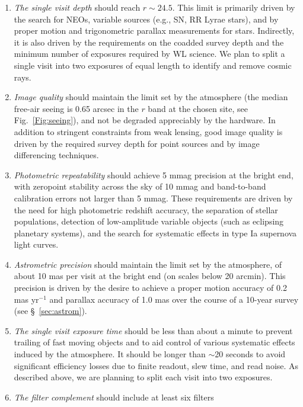 \begin{enumerate}
\item  \textit{The single visit depth} should reach $r\sim24.5$. This limit is
   primarily driven by the search for NEOs, variable sources (e.g., SN,
   RR Lyrae stars), and by proper motion and trigonometric parallax
   measurements for stars. Indirectly, it is also driven by the
   requirements on the coadded survey depth and the minimum number of
   exposures required by WL science.  We plan to split a single visit
   into two exposures of equal length to identify and remove cosmic
   rays.
\item  \textit{Image quality} should maintain the limit set by the
     atmosphere (the median free-air seeing is 0.65 arcsec in the $r$ band
     at the chosen site, see Fig.~\ref{Fig:seeing}),
     and not be degraded appreciably by the hardware. In addition to stringent
     constraints from weak lensing, good image quality is driven by the
     required survey depth for point sources and by image differencing
     techniques.
\item  \textit{Photometric repeatability} should achieve 5 mmag precision
     at the bright end, with zeropoint stability across the sky of 10 mmag
     and band-to-band calibration errors not larger than 5 mmag.
     These requirements are driven by the need for high photometric redshift accuracy,
     the separation of stellar populations, detection of low-amplitude variable
     objects (such as eclipsing planetary systems), and the search for
     systematic effects in type Ia supernova light curves.
\item  \textit{Astrometric precision} should maintain the limit set by
     the atmosphere, of about 10 mas per visit at the bright end
     (on scales below 20 arcmin). This precision is driven by the desire to
     achieve a proper motion accuracy of 0.2 mas yr$^{-1}$ and parallax accuracy of
     1.0 mas over the course of a 10-year survey (see \S~\ref{sec:astrom}).
\item  \textit{The single visit exposure time}
should be less than about a minute
    to prevent trailing of fast moving objects and to aid control
    of various systematic effects induced by the atmosphere. It should
    be longer than $\sim$20 seconds to avoid significant efficiency losses due to
    finite readout, slew time, and read noise.  As described above, we
    are planning to split each visit into two exposures.
\item  \textit{The filter complement} should include at least six filters

\end{enumerate}
